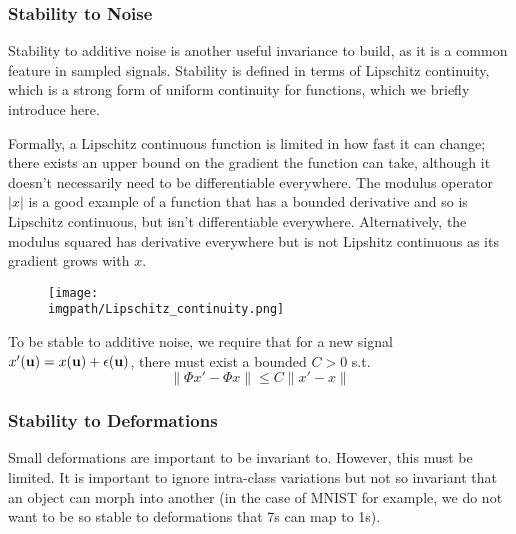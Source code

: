 \subsubsection{Stability to Noise}
  Stability to additive noise is another useful invariance to build,
  as it is a common feature in sampled signals. Stability is defined in terms of
  Lipschitz continuity, which is a strong form of uniform continuity for
  functions, which we briefly introduce here.

  Formally, a Lipschitz continuous function is limited in how fast it can change;
  there exists an upper bound on the gradient the function can take, although it
  doesn't necessarily need to be differentiable everywhere. The modulus operator
  $|x|$ is a good example of a function that has a bounded derivative and so is
  Lipschitz continuous, but isn't differentiable everywhere. Alternatively, the
  modulus squared has derivative everywhere but is not Lipshitz continuous as
  its gradient grows with $x$.

  \begin{figure}
    \begin{center}
      \texttt{[image: \\imgpath/Lipschitz\_continuity.png]}
      \label{fig:lipschitz}
    \end{center}
  \end{figure}

  To be stable to additive noise, we require that for 
  a new signal $x'(\mathbf{u}) = x(\mathbf{u}) + \epsilon(\mathbf{u})$, there must exist
  a bounded $C>0$ s.t.
  \begin{equation}\label{eq:scat_noise_stability}
    \|\Phi x' - \Phi x\| \leq C \|x' - x\|
  \end{equation}

\subsubsection{Stability to Deformations}
  Small deformations are important to be invariant to. However, this must be
  limited. It is important to ignore intra-class variations 
  but not so invariant that an object can
  morph into another (in the case of MNIST for example, we do not want to be so
  stable to deformations that 7s can map to 1s). 
  
